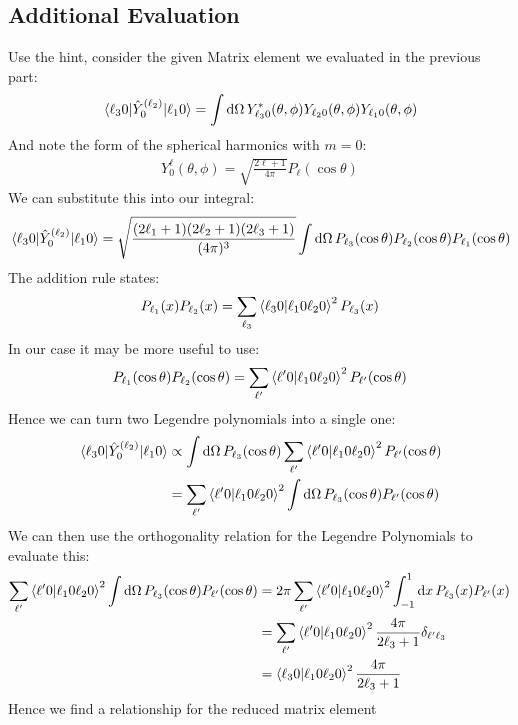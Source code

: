 \documentclass[12pt]{article}
\renewcommand{\l}{\ell}
\begin{document}
\subsection{Additional Evaluation}
Use the hint, consider the given Matrix element we evaluated in the previous part:
\begin{align*}
  \mel{\l_30}{\hat{Y}^{(\l_2)}_0}{\l_10}
  =\int\dd{\Omega}Y^*_{\l_30}(\theta,\phi)Y_{\l_20}(\theta,\phi)
  Y_{\l_10}(\theta,\phi)
\end{align*}
And note the form of the spherical harmonics with $m=0$:
\begin{align*}
  Y_0^{\l}(\theta,\phi)=\sqrt{\frac{2\l+1}{4\pi}}P_\l(\cos\theta)
\end{align*}
We can substitute this into our integral:
\begin{align*}
  \mel{\l_30}{\hat{Y}^{(\l_2)}_0}{\l_10}
  =\sqrt{\frac{(2\l_1+1)(2\l_2+1)(2\l_3+1)}{(4\pi)^3}}
  \int\dd{\Omega}P_{\l_3}(\cos\theta)P_{\l_2}(\cos\theta)P_{\l_1}(\cos\theta)
\end{align*}
The addition rule states:
\begin{align*}
  P_{\l_1}(x)P_{\l_2}(x)=\sum_{\l_3}\ip{\l_30}{\l_10\l_20}^2P_{\l_3}(x)
\end{align*}
In our case it may be more useful to use:
\begin{align*}
  P_{\l_1}(\cos\theta)P_{\l_2}(\cos\theta)=
  \sum_{\l'}\ip{\l'0}{\l_10\l_20}^2P_{\l'}(\cos\theta)
\end{align*}
Hence we can turn two Legendre polynomials into a single one:
\begin{align*}
  \mel{\l_30}{\hat{Y}^{(\l_2)}_0}{\l_10}&\propto
  \int\dd{\Omega}P_{\l_3}(\cos\theta)\sum_{\l'}\ip{\l'0}{\l_10\l_20}^2
  P_{\l'}(\cos\theta)\\
  &=\sum_{\l'}\ip{\l'0}{\l_10\l_20}^2\int\dd{\Omega}
  P_{\l_3}(\cos\theta)P_{\l'}(\cos\theta)
\end{align*}
We can then use the orthogonality relation for the Legendre Polynomials to evaluate this:
\begin{align*}
  \sum_{\l'}\ip{\l'0}{\l_10\l_20}^2\int\dd{\Omega}
  P_{\l_3}(\cos\theta)P_{\l'}(\cos\theta)&=
  2\pi\sum_{\l'}\ip{\l'0}{\l_10\l_20}^2\int_{-1}^1\dd{x}P_{\l_3}(x)P_{\l'}(x)\\
  &=\sum_{\l'}\ip{\l'0}{\l_10\l_20}^2\frac{4\pi}{2\l_3+1}\delta_{\l'\l_3}\\
  &=\ip{\l_30}{\l_10\l_20}^2\frac{4\pi}{2\l_3+1}
\end{align*}
Hence we find a relationship for the reduced matrix element
\end{document}
